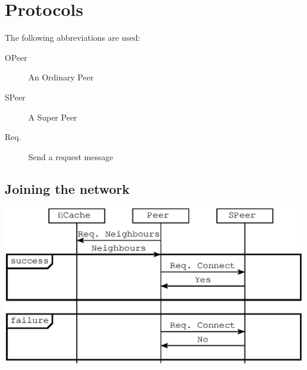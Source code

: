 \section{Protocols}

The following abbreviations are used:

\begin{description}
  \item[OPeer] An Ordinary Peer
  \item[SPeer] A Super Peer
  \item[Req.] Send a request message
\end{description}


\subsection{Joining the network}


\includegraphics{protocol_connect.eps}


